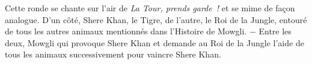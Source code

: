 
{\footnotesize Cette ronde se chante sur l'air de \emph{La Tour, prends garde !} et se mime de façon analogue. D'un côté, Shere Khan, le Tigre, de l'autre, le Roi de la Jungle, entouré de tous les autres animaux mentionnés dans l'Histoire de Mowgli. − Entre les deux, Mowgli qui provoque Shere Khan et demande au Roi de la Jungle l'aide de tous les animaux successivement pour vaincre Shere Khan.\par}



